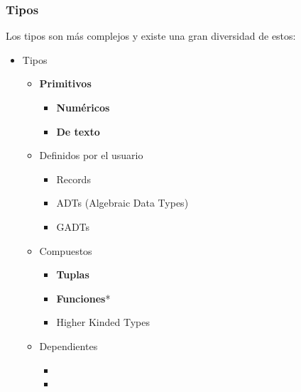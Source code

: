 \documentclass{beamer}
\begin{document}
\begin{frame}[fragile]
  \frametitle{Tipos}

  Los tipos son más complejos y existe una gran diversidad de estos:

  \begin{itemize}
    \item Tipos
      \begin{itemize}
        \item \textbf{Primitivos}
          \begin{itemize}
            \item \textbf{Numéricos}
            \item \textbf{De texto}
          \end{itemize}
        \item Definidos por el usuario
          \begin{itemize}
            \item Records
            \item ADTs (Algebraic Data Types)
            \item GADTs
          \end{itemize}
        \item Compuestos
          \begin{itemize}
            \item \textbf{Tuplas}
            \item \textbf{Funciones}*
            \item Higher Kinded Types
          \end{itemize}
        \item Dependientes
          \begin{itemize}
            \item \Pi
            \item \Sigma
          \end{itemize}
      \end{itemize}
  \end{itemize}
\end{frame}
\end{document}
